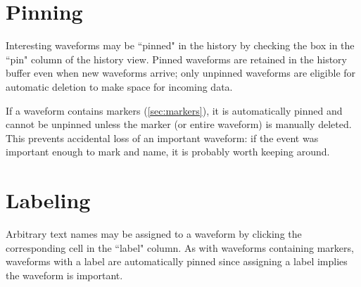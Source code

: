 
\section{Pinning}

Interesting waveforms may be ``pinned" in the history by checking the box in the ``pin" column of the history view.
Pinned waveforms are retained in the history buffer even when new waveforms arrive; only unpinned waveforms
are eligible for automatic deletion to make space for incoming data.

If a waveform contains markers (\ref{sec:markers}), it is automatically pinned and cannot be unpinned unless the marker
(or entire waveform) is manually deleted. This prevents accidental loss of an important waveform: if the event was
important enough to mark and name, it is probably worth keeping around.

\section{Labeling}

Arbitrary text names may be assigned to a waveform by clicking the corresponding cell in the ``label" column. As with
waveforms containing markers, waveforms with a label are automatically pinned since assigning a label implies the
waveform is important.

